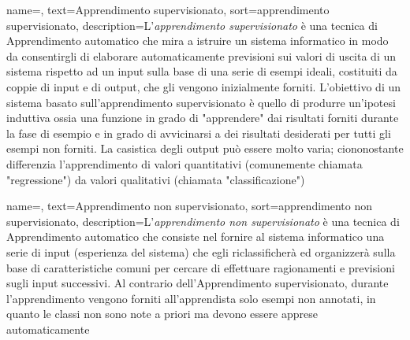 {
    name=,
    text=Apprendimento supervisionato,
    sort=apprendimento supervisionato,
    description={L'\textit{apprendimento supervisionato} è una tecnica di \gls{Apprendimento automatico} che mira a istruire un sistema informatico in modo da consentirgli di elaborare automaticamente previsioni sui valori di uscita di un sistema rispetto ad un input sulla base di una serie di esempi ideali, costituiti da coppie di input e di output, che gli vengono inizialmente forniti. L'obiettivo di un sistema basato sull'apprendimento supervisionato è quello di produrre un'ipotesi induttiva ossia una funzione in grado di "apprendere" dai risultati forniti durante la fase di esempio e in grado di avvicinarsi a dei risultati desiderati per tutti gli esempi non forniti. La casistica degli output può essere molto varia; ciononostante differenzia l'apprendimento di valori quantitativi (comunemente chiamata "regressione") da valori qualitativi (chiamata "classificazione")
}
}

{
    name=,
    text=Apprendimento non supervisionato,
    sort=apprendimento non supervisionato,
    description={L'\textit{apprendimento non supervisionato} è una tecnica di \gls{Apprendimento automatico} che consiste nel fornire al sistema informatico una serie di input (esperienza del sistema) che egli riclassificherà ed organizzerà sulla base di caratteristiche comuni per cercare di effettuare ragionamenti e previsioni sugli input successivi. Al contrario dell'\gls{Apprendimento supervisionato}, durante l'apprendimento vengono forniti all'apprendista solo esempi non annotati, in quanto le classi non sono note a priori ma devono essere apprese automaticamente
}
}


